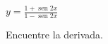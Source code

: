 \item $\displaystyle y = \frac{1 + \operatorname{sen} 2x}{1 - \operatorname{sen} 2x}$
\par
Encuentre la derivada.
